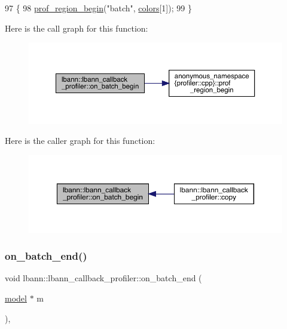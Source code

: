 \begin{DoxyCode}
97                                                      \{
98   \hyperlink{namespaceanonymous__namespace_02profiler_8cpp_03_ad2ea0278cd1f25dc30ddd76194ace64b}{prof\_region\_begin}(\textcolor{stringliteral}{"batch"}, \hyperlink{classlbann_1_1lbann__callback__profiler_addf3323ce665956dc4988e3850bceb30}{colors}[1]);
99 \}
\end{DoxyCode}
Here is the call graph for this function\+:\nopagebreak
\begin{figure}[H]
\begin{center}
\leavevmode
\includegraphics[width=350pt]{classlbann_1_1lbann__callback__profiler_a4a60f7470bf36c6833862d47d1a7ce01_cgraph}
\end{center}
\end{figure}
Here is the caller graph for this function\+:\nopagebreak
\begin{figure}[H]
\begin{center}
\leavevmode
\includegraphics[width=350pt]{classlbann_1_1lbann__callback__profiler_a4a60f7470bf36c6833862d47d1a7ce01_icgraph}
\end{center}
\end{figure}
\mbox{\label{classlbann_1_1lbann__callback__profiler_ad7db0233f3a0c91c10a15d0951bb1747}} 
\subsubsection{\texorpdfstring{on\+\_\+batch\+\_\+end()}{on\_batch\_end()}}
{\footnotesize\ttfamily void lbann\+::lbann\+\_\+callback\+\_\+profiler\+::on\+\_\+batch\+\_\+end (\begin{DoxyParamCaption}\item[{\hyperlink{classlbann_1_1model}{model} $\ast$}]{m }\end{DoxyParamCaption})\hspace{0.3cm}{\ttfamily [override]}, {\ttfamily [virtual]}}

